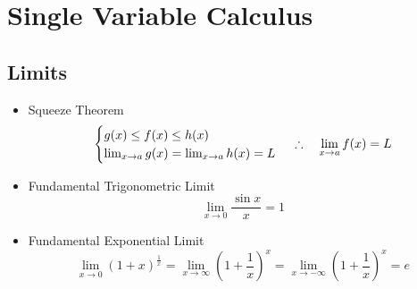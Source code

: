 \section{Single Variable Calculus}

\subsection{Limits}
	\begin{itemize}
		\item Squeeze Theorem
			\begin{equation}
				\begin{cases}
					g(x) \leq f(x) \leq h(x) \\
					\lim_{x \rightarrow a} g(x) = \lim_{x \rightarrow a} h(x) = L
				\end{cases} \\
				\therefore \quad \lim_{x \rightarrow a} f(x) = L
			\end{equation}
		\item Fundamental Trigonometric Limit
			\begin{equation}
				\lim_{x \rightarrow 0} \frac{\sin x}{x} = 1
			\end{equation}
		\item Fundamental Exponential Limit
			\begin{equation}
				\lim_{x \rightarrow 0} (1+x)^{\frac{1}{x}} = \lim_{x \rightarrow \infty} \left( 1+ \frac{1}{x} \right)^x = \lim_{x \rightarrow - \infty} \left( 1+ \frac{1}{x} \right)^x = e
			\end{equation}
	\end{itemize}
